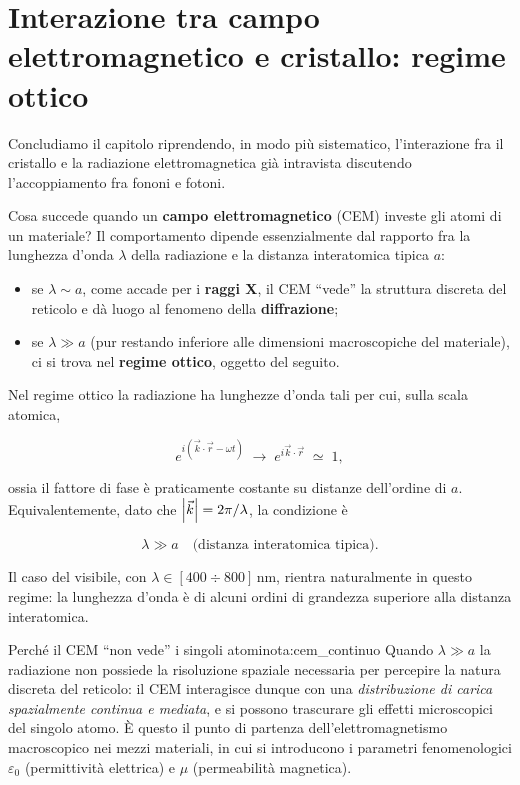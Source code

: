 \section{Interazione tra campo elettromagnetico e cristallo: regime ottico}

Concludiamo il capitolo riprendendo, in modo più sistematico, l'interazione fra il cristallo e la radiazione elettromagnetica già intravista discutendo l'accoppiamento fra fononi e fotoni.

Cosa succede quando un \textbf{campo elettromagnetico} (CEM) investe gli atomi di un materiale? Il comportamento dipende essenzialmente dal rapporto fra la lunghezza d'onda \( \lambda \) della radiazione e la distanza interatomica tipica \( a \):

\begin{itemize}
    \item se \( \lambda \sim a \), come accade per i \textbf{raggi X}, il CEM ``vede'' la struttura discreta del reticolo e dà luogo al fenomeno della \textbf{diffrazione};
    \item se \( \lambda \gg a \) (pur restando inferiore alle dimensioni macroscopiche del materiale), ci si trova nel \textbf{regime ottico}, oggetto del seguito.
\end{itemize}

Nel regime ottico la radiazione ha lunghezze d'onda tali per cui, sulla scala atomica,

\begin{equation}
    e^{i (\vec{k} \cdot \vec{r} - \omega t)} \;\longrightarrow\; e^{i \vec{k} \cdot \vec{r}} \;\simeq\; 1,
\end{equation}

ossia il fattore di fase è praticamente costante su distanze dell'ordine di \( a \). Equivalentemente, dato che \( \abs{\vec{k}} = 2\pi/\lambda \), la condizione è

\begin{equation}
    \lambda \gg a \quad \text{(distanza interatomica tipica)}.
\end{equation}

Il caso del visibile, con \( \lambda \in [400 \div 800] \, \text{nm} \), rientra naturalmente in questo regime: la lunghezza d'onda è di alcuni ordini di grandezza superiore alla distanza interatomica.

\begin{note}{Perché il CEM ``non vede'' i singoli atomi}{nota:cem_continuo}
Quando \( \lambda \gg a \) la radiazione non possiede la risoluzione spaziale necessaria per percepire la natura discreta del reticolo: il CEM interagisce dunque con una \emph{distribuzione di carica spazialmente continua e mediata}, e si possono trascurare gli effetti microscopici del singolo atomo. È questo il punto di partenza dell'elettromagnetismo macroscopico nei mezzi materiali, in cui si introducono i parametri fenomenologici \( \varepsilon_0 \) (permittività elettrica) e \( \mu \) (permeabilità magnetica).
\end{note}

